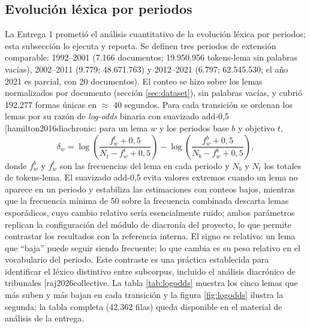 \documentclass[11pt]{tg_usta}
\makeatletter
\renewcommand{\cite}{\@ifnextchar[{\@tempswatrue\@citex}{\@tempswafalse\@citex[]}}
\makeatother
\begin{document}
\subsection{Evolución léxica por periodos}
\label{sec:periodos}
La Entrega 1 prometió el análisis cuantitativo de la evolución léxica por periodos; esta subsección lo ejecuta y reporta. Se definen tres periodos de extensión comparable: 1992--2001 (7.166 documentos; 19.950.956 tokens-lema sin palabras vacías), 2002--2011 (9.779; 48.671.763) y 2012--2021 (6.797; 62.545.530; el año 2021 es parcial, con 20 documentos). El conteo se hizo sobre los lemas normalizados por documento (sección \ref{sec:dataset}), sin palabras vacías, y cubrió 192.277 formas únicas en $\approx$ 40 segundos. Para cada transición se ordenan los lemas por su razón de \emph{log-odds} binaria con suavizado add-0,5 \cite{hamilton2016diachronic}: para un lema $w$ y los periodos base $b$ y objetivo $t$,
\begin{equation}
\delta_w = \log\!\left(\frac{f_w^{t} + 0,5}{N_t - f_w^{t} + 0,5}\right) - \log\!\left(\frac{f_w^{b} + 0,5}{N_b - f_w^{b} + 0,5}\right),
\label{eq:logodds}
\end{equation}
donde $f_w^{b}$ y $f_w^{t}$ son las frecuencias del lema en cada periodo y $N_b$ y $N_t$ los totales de tokens-lema. El suavizado add-0,5 evita valores extremos cuando un lema no aparece en un periodo y estabiliza las estimaciones con conteos bajos, mientras que la frecuencia mínima de 50 sobre la frecuencia combinada descarta lemas esporádicos, cuyo cambio relativo sería esencialmente ruido; ambos parámetros replican la configuración del módulo de diacronía del proyecto, lo que permite contrastar los resultados con la referencia interna. El signo es relativo: un lema que ``baja'' puede seguir siendo frecuente; lo que cambia es su peso relativo en el vocabulario del periodo. Este contraste es una práctica establecida para identificar el léxico distintivo entre subcorpus, incluido el análisis diacrónico de tribunales \cite{raj2026collective}. La tabla \ref{tab:logodds} muestra los cinco lemas que más suben y más bajan en cada transición y la figura \ref{fig:logodds} ilustra la segunda; la tabla completa (42.362 filas) queda disponible en el material de análisis de la entrega.
\end{document}
